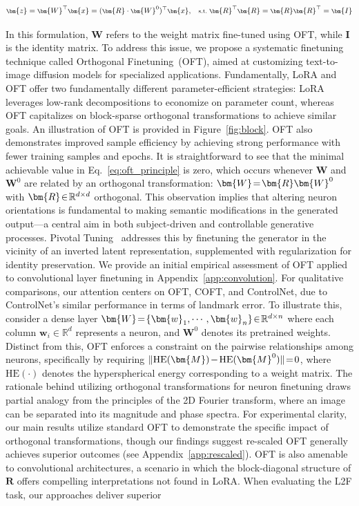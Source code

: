 \begin{equation}\label{eq:oft_general}
    \footnotesize
    \bm{z} = \bm{W}^\top \bm{x} = (\bm{R} \cdot \bm{W}^0)^\top \bm{x},~~~\text{s.t.}~\bm{R}^\top \bm{R} = \bm{R} \bm{R}^\top = \bm{I}
\end{equation}

In this formulation, $\bm{W}$ refers to the weight matrix fine-tuned using OFT, while $\bm{I}$ is the identity matrix. To address this issue, we propose a systematic finetuning technique called Orthogonal Finetuning~(OFT), aimed at customizing text-to-image diffusion models for specialized applications. Fundamentally, LoRA and OFT offer two fundamentally different parameter-efficient strategies: LoRA leverages low-rank decompositions to economize on parameter count, whereas OFT capitalizes on block-sparse orthogonal transformations to achieve similar goals. An illustration of OFT is provided in Figure~\ref{fig:block}. OFT also demonstrates improved sample efficiency by achieving strong performance with fewer training samples and epochs. It is straightforward to see that the minimal achievable value in Eq.~\eqref{eq:oft_principle} is zero, which occurs whenever $\bm{W}$ and $\bm{W}^0$ are related by an orthogonal transformation: $\thickmuskip=2mu \medmuskip=2mu \bm{W}=\bm{R}\bm{W}^0$ with $\thickmuskip=2mu \medmuskip=2mu \bm{R}\in\mathbb{R}^{d\times d}$ orthogonal. This observation implies that altering neuron orientations is fundamental to making semantic modifications in the generated output—a central aim in both subject-driven and controllable generative processes. Pivotal Tuning~\cite{roich2022pivotal} addresses this by finetuning the generator in the vicinity of an inverted latent representation, supplemented with regularization for identity preservation. We provide an initial empirical assessment of OFT applied to convolutional layer finetuning in Appendix~\ref{app:convolution}. For qualitative comparisons, our attention centers on OFT, COFT, and ControlNet, due to ControlNet's similar performance in terms of landmark error. To illustrate this, consider a dense layer $\thickmuskip=2mu \medmuskip=2mu \bm{W}=\{\bm{w}_1,\cdots,\bm{w}_n\}\in\mathbb{R}^{d\times n}$ where each column $\bm{w}_i\in\mathbb{R}^{d}$ represents a neuron, and $\bm{W}^0$ denotes its pretrained weights. Distinct from this, OFT enforces a constraint on the pairwise relationships among neurons, specifically by requiring $\thickmuskip=2mu \medmuskip=2mu \| \text{HE}(\bm{M})-\text{HE}(\bm{M}^0) \|=0$, where $\text{HE}(\cdot)$ denotes the hyperspherical energy corresponding to a weight matrix. The rationale behind utilizing orthogonal transformations for neuron finetuning draws partial analogy from the principles of the 2D Fourier transform, where an image can be separated into its magnitude and phase spectra. For experimental clarity, our main results utilize standard OFT to demonstrate the specific impact of orthogonal transformations, though our findings suggest re-scaled OFT generally achieves superior outcomes (see Appendix~\ref{app:rescaled}). OFT is also amenable to convolutional architectures, a scenario in which the block-diagonal structure of $\bm{R}$ offers compelling interpretations not found in LoRA. When evaluating the L2F task, our approaches deliver superior 